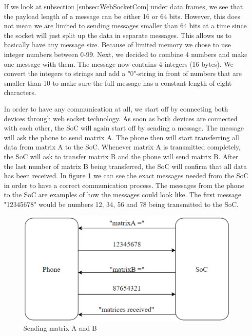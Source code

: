 \documentclass[a4paper, 11pt]{report}
\begin{document}
If we look at subsection \ref{subsec:WebSocketCom} under data frames, we see that the payload length of a message can be either 16 or 64 bits. However, this does not mean we are limited to sending messages smaller than 64 bits at a time since the socket will just split up the data in separate messages. This allows us to basically have any message size. Because of limited memory we chose to use integer numbers between 0-99. Next, we decided to combine 4 numbers and make one message with them. The message now contains 4 integers (16 bytes). We convert the integers to strings and add a "0"-string in front of numbers that are smaller than 10 to make sure the full message has a constant length of eight characters.

In order to have any communication at all, we start off by connecting both devices through web socket technology. As soon as both devices are connected with each other, the SoC will again start off by sending a message. The message will ask the phone to send matrix A. The phone then will start transferring all data from matrix A to the SoC. Whenever matrix A is transmitted completely, the SoC will ask to transfer matrix B and the phone will send matrix B. After the last number of matrix B being transferred, the SoC will confirm that all data has been received. In figure \ref{fig:Matrices} we can see the exact messages needed from the SoC in order to have a correct communication process. The messages from the phone to the SoC are examples of how the messages could look like. The first message "12345678" would be numbers 12, 34, 56 and 78 being transmitted to the SoC.

\begin{figure}[ht]
\centering
\includegraphics[scale=0.7]{images/webSocketCom.pdf}
\caption{Sending matrix A and B}\label{fig:Matrices}
\end{figure}
\end{document}
